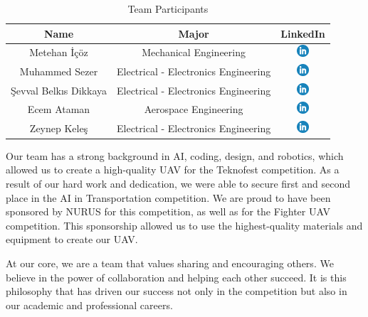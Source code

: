\documentclass{article}
\begin{document}
\begin{table}[hbt!]
\centering
\begin{tabular}{|c|c|c|}
    \hline
    Name & Major & LinkedIn \\
    \hline
    Metehan İçöz & Mechanical Engineering & \href{https://www.linkedin.com/in/metehan-içöz-735bab206/}{\includegraphics[height=1.2em]{linkedin.png}} \\
    Muhammed Sezer & Electrical - Electronics Engineering & \href{https://www.linkedin.com/in/muhammed-sezer-160428208/}{\includegraphics[height=1.2em]{linkedin.png}} \\
    Şevval Belkıs Dikkaya & Electrical - Electronics Engineering & \href{https://www.linkedin.com/in/sbdikkaya/}{\includegraphics[height=1.2em]{linkedin.png}} \\
    Ecem Ataman & Aerospace Engineering & \href{https://www.linkedin.com/in/ecemataman/}{\includegraphics[height=1.2em]{linkedin.png}} \\
    Zeynep Keleş & Electrical - Electronics Engineering & \href{https://www.linkedin.com/in/zeynep-bilge-keleş-7ba917255/}{\includegraphics[height=1.2em]{linkedin.png}} \\
    \hline
\end{tabular}
\caption[short]{Team Participants}
\end{table}


Our team has a strong background in AI, coding, design, and robotics, which allowed us to create a high-quality UAV for the Teknofest competition. As a result of our hard work and dedication, we were able to secure first and second place in the AI in Transportation competition. We are proud to have been sponsored by NURUS for this competition, as well as for the Fighter UAV competition. This sponsorship allowed us to use the highest-quality materials and equipment to create our UAV.

At our core, we are a team that values sharing and encouraging others. We believe in the power of collaboration and helping each other succeed. It is this philosophy that has driven our success not only in the competition but also in our academic and professional careers.
\FloatBarrier
\end{document}
